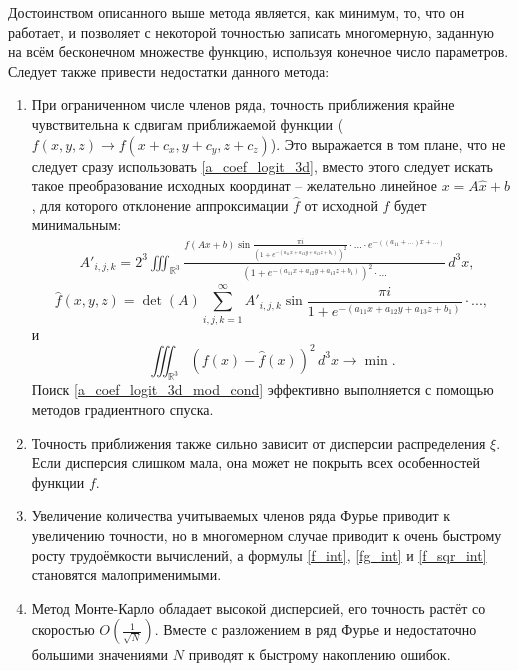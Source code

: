 Достоинством описанного выше метода является, как минимум, то, что он работает, и позволяет с некоторой точностью записать многомерную, заданную на всём бесконечном множестве функцию, используя конечное число параметров. Следует также привести недостатки данного метода:
\begin{enumerate}
\item При ограниченном числе членов ряда, точность приближения крайне чувствительна к сдвигам приближаемой функции ($f(x, y, z) \to f(x+c_x, y+c_y, z+c_z)$). Это выражается в том плане, что  не следует сразу использовать \ref{a_coef_logit_3d}, вместо этого следует искать такое преобразование исходных координат -- желательно линейное $x = A\hat{x} + b$, для которого отклонение аппроксимации $\hat{f}$ от исходной $f$ будет минимальным:
\begin{align}
	&A'_{i,j,k} = 2^3\iiint_{\mathbb{R}^3}\frac{f(Ax+b)\sin\frac{\pi i}{(1+e^{-(a_{11}x+a_{12}y+a_{13}z+b_1)})^2}\cdot...\cdot e^{-((a_{11}+...)x+...)}}{(1+e^{-(a_{11}x+a_{12}y+a_{13}z+b_1)})^2\cdot...}\, d^3x,
	\label{a_coef_logit_3d_mod}
\end{align}
\begin{equation}
	\hat{f}(x,y,z) = \det(A)\sum_{i,j,k=1}^\infty A'_{i,j,k}\sin{\frac{\pi i}{1 + e^{-(a_{11}x+a_{12}y+a_{13}z+b_1)}}}\cdot...,
	\label{logit_fourier_3d_mod}
\end{equation}
и
\begin{equation}
	\iiint_{\mathbb{R}^3}{(f(x) - \hat{f}(x))}^2\,d^3x \to \min.
	\label{a_coef_logit_3d_mod_cond}
\end{equation}
Поиск \ref{a_coef_logit_3d_mod_cond} эффективно выполняется с помощью методов градиентного спуска.

\item Точность приближения также сильно зависит от дисперсии распределения $\xi$. Если дисперсия слишком мала, она может не покрыть всех особенностей функции $f$.

\item Увеличение количества учитываемых членов ряда Фурье приводит к увеличению точности, но в многомерном случае приводит к очень быстрому росту трудоёмкости вычислений, а формулы \ref{f_int}, \ref{fg_int} и \ref{f_sqr_int} становятся малоприменимыми.

\item Метод Монте-Карло обладает высокой дисперсией, его точность растёт со скоростью $O(\frac{1}{\sqrt{N}})$. Вместе с разложением в ряд Фурье и недостаточно большими значениями $N$ приводят к быстрому накоплению ошибок.
\end{enumerate}

